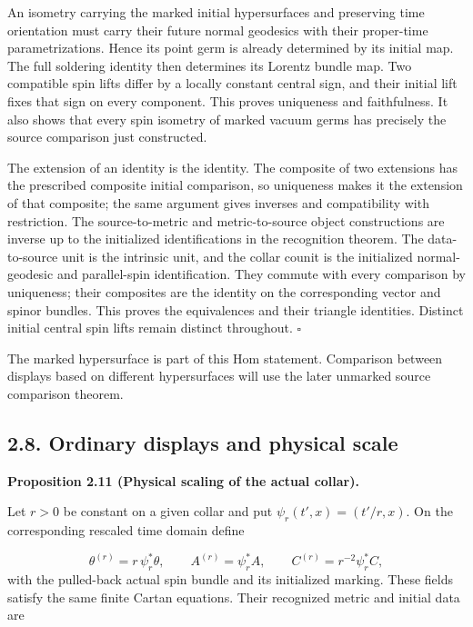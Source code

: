\documentclass[
  english,
  11pt,
  reqno]{amsart}
\makeatletter
\newcommand{\pandocstatementheading}[1]{%
  \par\addpenalty{\@beginparpenalty}%
  \addvspace{.5\baselineskip plus .2\baselineskip minus .2\baselineskip}%
  {\normalfont\bfseries #1\par}%
  \nobreak\@afterindenttrue\@afterheading
}
\makeatother
\begin{document}
An isometry carrying the marked initial hypersurfaces and preserving
time orientation must carry their future normal geodesics with their
proper-time parametrizations. Hence its point germ is already determined
by its initial map. The full soldering identity then determines its
Lorentz bundle map. Two compatible spin lifts differ by a locally
constant central sign, and their initial lift fixes that sign on every
component. This proves uniqueness and faithfulness. It also shows that
every spin isometry of marked vacuum germs has precisely the source
comparison just constructed.

The extension of an identity is the identity. The composite of two
extensions has the prescribed composite initial comparison, so
uniqueness makes it the extension of that composite; the same argument
gives inverses and compatibility with restriction. The source-to-metric
and metric-to-source object constructions are inverse up to the
initialized identifications in the recognition theorem. The
data-to-source unit is the intrinsic unit, and the collar counit is the
initialized normal-geodesic and parallel-spin identification. They
commute with every comparison by uniqueness; their composites are the
identity on the corresponding vector and spinor bundles. This proves the
equivalences and their triangle identities. Distinct initial central
spin lifts remain distinct throughout. \hfill\(\square\)

The marked hypersurface is part of this Hom statement. Comparison
between displays based on different hypersurfaces will use the later
unmarked source comparison theorem.

\subsection{2.8. Ordinary displays and physical
scale}\label{ordinary-displays-and-physical-scale}\label{sec:online-ordinary-collars-and-scale}

\pandocstatementheading{\leavevmode{}\label{prop:online-cartan-physical-scale}Proposition 2.11 (Physical scaling of the actual collar).}

Let \(r>0\) be constant on a given collar and put
\(\psi_r(t',x)=(t'/r,x)\). On the corresponding rescaled time domain
define

\label{eq:online-cartan-physical-scale-fields} \[
\theta^{(r)}=r\,\psi_r^*\theta,
\qquad
A^{(r)}=\psi_r^*A,
\qquad
C^{(r)}=r^{-2}\psi_r^*C,
\] with the pulled-back actual spin bundle and its initialized marking.
These fields satisfy the same finite Cartan equations. Their recognized
metric and initial data are
\end{document}
